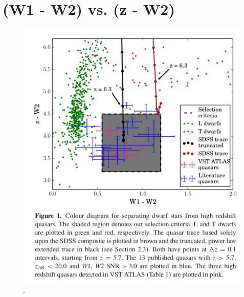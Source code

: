 \documentclass[11pt,a4paper]{article}
\begin{document}
\section{(W1 - W2) vs. (z - W2)}
    \begin{figure}
      \centering
      \includegraphics[width=16.0cm,  trim={0.0cm 0 0 0},clip, angle=0]{Carnall_2015_Fig1.jpeg}
      \caption[]{\citet{Banados2016}.} 
      \label{fig:Banados2016}
    \end{figure}
\end{document}
